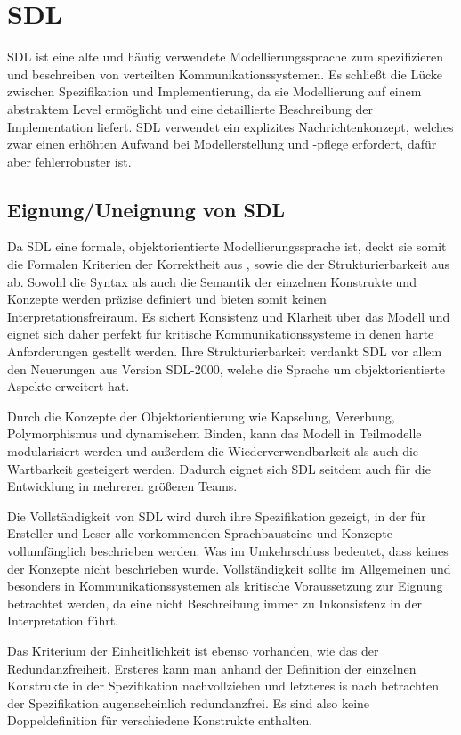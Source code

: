 \section{SDL}
\label{sc:SDLB}
\ac{SDL} ist eine alte und häufig verwendete Modellierungssprache zum spezifizieren und beschreiben von verteilten Kommunikationssystemen. 
Es schließt die Lücke zwischen Spezifikation und Implementierung, da sie Modellierung auf einem abstraktem Level ermöglicht und eine detaillierte Beschreibung der Implementation liefert. \ac{SDL} verwendet ein  explizites  Nachrichtenkonzept,  welches  zwar  einen  erhöhten  Aufwand  bei  Modellerstellung und -pflege erfordert, dafür aber fehlerrobuster ist. 
\subsection{Eignung/Uneignung von SDL}
\label{scc:SDL_Eignung}
Da \ac{SDL} eine formale, objektorientierte Modellierungssprache ist, deckt sie somit die Formalen Kriterien der Korrektheit aus \pageref{scc:Korrektheit}, sowie die der Strukturierbarkeit aus \pageref{scc:Strukturierbarkeit} ab. Sowohl die Syntax als auch die Semantik der einzelnen Konstrukte und Konzepte werden präzise definiert und bieten somit keinen Interpretationsfreiraum. Es sichert Konsistenz und Klarheit über das Modell und eignet sich daher perfekt für kritische Kommunikationssysteme in denen harte Anforderungen gestellt werden. Ihre Strukturierbarkeit verdankt \ac{SDL} vor allem den Neuerungen aus Version \ac{SDL}-2000, welche die Sprache um objektorientierte Aspekte erweitert hat.

Durch die Konzepte der Objektorientierung wie Kapselung, Vererbung, Polymorphismus und dynamischem Binden, kann das Modell in Teilmodelle modularisiert werden und außerdem die Wiederverwendbarkeit als auch die Wartbarkeit gesteigert werden. Dadurch eignet sich \ac{SDL} seitdem auch für die Entwicklung in mehreren größeren Teams. 

Die Vollständigkeit von \ac{SDL} wird durch ihre Spezifikation gezeigt, in der für Ersteller und Leser alle vorkommenden Sprachbausteine und Konzepte vollumfänglich beschrieben werden. Was im Umkehrschluss bedeutet, dass keines der Konzepte nicht beschrieben wurde. Vollständigkeit sollte im Allgemeinen und besonders in Kommunikationssystemen als kritische Voraussetzung zur Eignung betrachtet werden, da eine nicht Beschreibung immer zu Inkonsistenz in der Interpretation führt.

Das Kriterium der Einheitlichkeit ist ebenso vorhanden, wie das der Redundanzfreiheit. Ersteres kann man anhand der Definition der einzelnen Konstrukte in der Spezifikation nachvollziehen und letzteres is nach betrachten der Spezifikation augenscheinlich redundanzfrei. Es sind also keine Doppeldefinition für verschiedene Konstrukte enthalten. 

